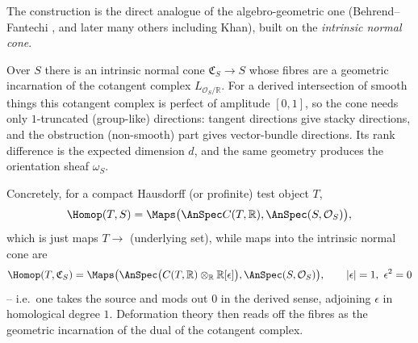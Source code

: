 The construction is the direct analogue of the algebro-geometric one (Behrend--%
Fantechi \cite{behrend1996intrinsicnormalcone}, and later many others including
Khan), built on the \emph{intrinsic normal cone}.

\begin{remark}
\label{rmk:24:intrinsic-cone}
Over $S$ there is an intrinsic normal cone $\mathfrak C_S\to S$ whose fibres are a
geometric incarnation of the cotangent complex $L_{\mathcal O_S/\mathbb R}$. For a
derived intersection of smooth things this cotangent complex is perfect of
amplitude $[0,1]$, so the cone needs only $1$-truncated (group-like) directions:
tangent directions give stacky directions, and the obstruction (non-smooth) part
gives vector-bundle directions. Its rank difference is the expected dimension $d$,
and the same geometry produces the orientation sheaf $\omega_S$.
\end{remark}

Concretely, for a compact Hausdorff (or profinite) test object $T$,
\begin{equation*}
\Homop(T,S)=\Maps\bigl(\AnSpec C(T,\mathbb R),\AnSpec(S,\mathcal O_S)\bigr),
\end{equation*}
which is just maps $T\to$ (underlying set), while maps into the intrinsic normal
cone are
\begin{equation*}
\Homop(T,\mathfrak C_S)=\Maps\bigl(\AnSpec\bigl(C(T,\mathbb R)\otimes_{\mathbb R}
\mathbb R[\epsilon]\bigr),\AnSpec(S,\mathcal O_S)\bigr),
\qquad |\epsilon|=1,\ \epsilon^2=0
\end{equation*}
-- i.e.\ one takes the source and mods out $0$ in the derived sense, adjoining
$\epsilon$ in homological degree $1$. Deformation theory then reads off the fibres
as the geometric incarnation of the dual of the cotangent complex.

